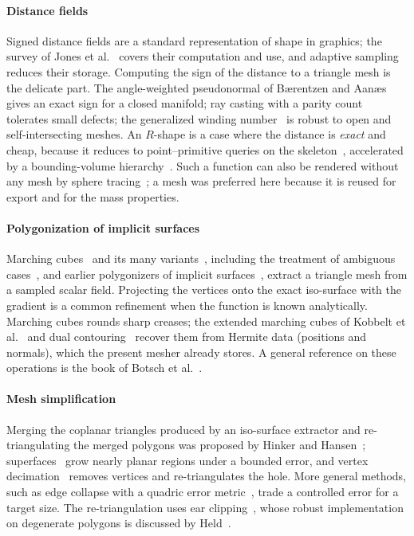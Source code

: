 \documentclass[11pt,a4paper]{article}
\begin{document}
\paragraph{Distance fields}
Signed distance fields are a standard representation of shape in graphics; the
survey of Jones et al.~\cite{jones2006} covers their computation and use, and
adaptive sampling~\cite{frisken2000} reduces their storage. Computing the sign of
the distance to a triangle mesh is the delicate part. The angle-weighted
pseudonormal of B{\ae}rentzen and Aan{\ae}s~\cite{baerentzen2005} gives an exact
sign for a closed manifold; ray casting with a parity
count~\cite{orourke1998,moller1997} tolerates small defects; the generalized
winding number~\cite{jacobson2013} is robust to open and self-intersecting meshes.
An $R$-shape is a case where the distance is \emph{exact} and cheap, because it
reduces to point--primitive queries on the
skeleton~\cite{vandenbergen2003,ericson2005}, accelerated by a bounding-volume
hierarchy~\cite{vandenbergen1997}. Such a function can also be rendered without
any mesh by sphere tracing~\cite{hart1996}; a mesh was preferred here because it
is reused for export and for the mass properties.

\paragraph{Polygonization of implicit surfaces}
Marching cubes~\cite{lorensen1987} and its many variants~\cite{newman2006},
including the treatment of ambiguous cases~\cite{nielson1991,lewiner2003}, and
earlier polygonizers of implicit surfaces~\cite{bloomenthal1988}, extract a
triangle mesh from a sampled scalar field. Projecting the vertices onto the exact
iso-surface with the gradient is a common refinement when the function is known
analytically. Marching cubes rounds sharp creases; the extended marching cubes of
Kobbelt et al.~\cite{kobbelt2001} and dual contouring~\cite{ju2002} recover them
from Hermite data (positions and normals), which the present mesher already
stores. A general reference on these operations is the book of Botsch et
al.~\cite{botsch2010}.

\paragraph{Mesh simplification}
Merging the coplanar triangles produced by an iso-surface extractor and
re-triangulating the merged polygons was proposed by Hinker and
Hansen~\cite{hinker1993}; superfaces~\cite{kalvin1996} grow nearly planar regions
under a bounded error, and vertex decimation~\cite{schroeder1992} removes vertices
and re-triangulates the hole. More general methods, such as edge collapse with a
quadric error metric~\cite{garland1997}, trade a controlled error for a target
size. The re-triangulation uses ear clipping~\cite{meisters1975,orourke1998},
whose robust implementation on degenerate polygons is discussed by
Held~\cite{held2001}.
\end{document}
